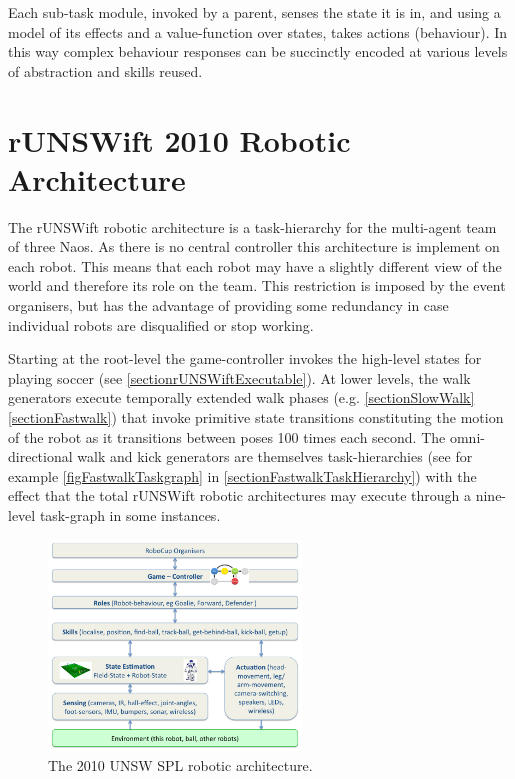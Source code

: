 \documentclass[pdftex,11pt,a4paper]{report}
\begin{document}
Each sub-task module, invoked by a parent, senses the state it is in, and using a model of its effects and a value-function over states, takes actions (behaviour).  In this way complex behaviour responses can be succinctly encoded at various levels of abstraction and skills reused. 

\section{rUNSWift 2010 Robotic Architecture} \label{sectionRoboticArchitecture2010}

The rUNSWift robotic architecture is a task-hierarchy for the multi-agent team of three Naos. As there is no central controller this architecture is implement on each robot. This means that each robot may have a slightly different view of the world and therefore its role on the team. This restriction is imposed by the event organisers, but has the advantage of providing some redundancy in case individual robots are disqualified or stop working.

Starting at the root-level the game-controller invokes the high-level states for playing soccer (see \autoref{sectionrUNSWiftExecutable}). At lower levels, the walk generators execute temporally extended walk phases (e.g. \autoref{sectionSlowWalk} \autoref{sectionFastwalk}) that invoke primitive state transitions constituting the motion of the robot as it transitions between poses 100 times each second. The omni-directional walk and kick generators are themselves task-hierarchies (see for example \autoref{figFastwalkTaskgraph} in \autoref{sectionFastwalkTaskHierarchy}) with the effect that the total rUNSWift robotic architectures may execute through a nine-level task-graph in some instances.  

\begin{figure}[!htp]
\centering
\includegraphics[width=0.6\textwidth]{figures/runswift2010architecture}
\caption{The 2010 UNSW SPL robotic architecture.} \label{figrunswift2010architecture}
\end{figure}
\end{document}
